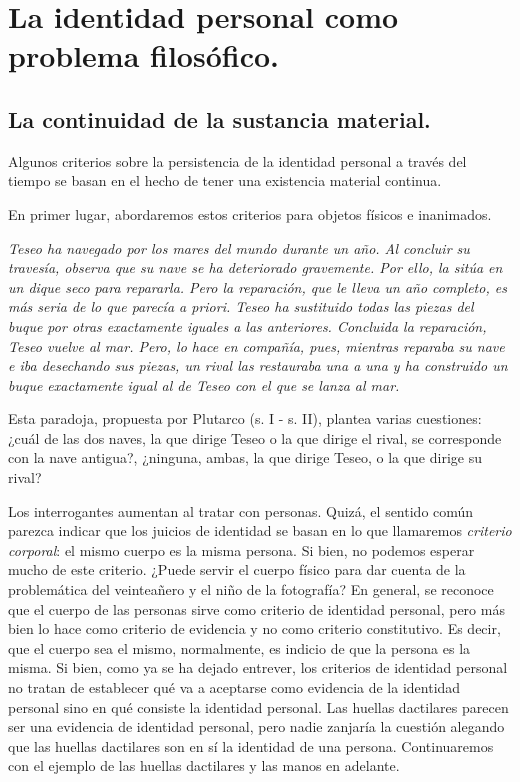 \documentclass[main.tex]{subfiles}
\begin{document}
\chapter{La identidad personal como problema filosófico.}	

\section{La continuidad de la sustancia material.}

Algunos criterios sobre la persistencia de la identidad personal a través del tiempo se basan en el hecho de tener una existencia material continua.

En primer lugar, abordaremos estos criterios para objetos físicos e inanimados.

\textit{Teseo ha navegado por los mares del mundo durante un año. Al concluir su travesía, observa que su nave se ha deteriorado gravemente. Por ello, la sitúa en un dique seco para repararla. Pero la reparación, que le lleva un año completo, es más seria de lo que parecía a priori. Teseo ha sustituido todas las piezas del buque por otras exactamente iguales a las anteriores. Concluida la reparación, Teseo vuelve al mar. Pero, lo hace en compañía, pues, mientras reparaba su nave e iba desechando sus piezas, un rival las restauraba una a una y ha construido un buque exactamente igual al de Teseo con el que se lanza al mar.}

Esta paradoja, propuesta por Plutarco (s. I - s. II), plantea varias cuestiones: ¿cuál de las dos naves, la que dirige Teseo o la que dirige el rival, se corresponde con la nave antigua?, ¿ninguna, ambas, la que dirige Teseo, o la que dirige su rival?

Los interrogantes aumentan al tratar con personas. Quizá, el sentido común parezca indicar que los juicios de identidad se basan en lo que llamaremos \textit{criterio corporal}: el mismo cuerpo es la misma persona. Si bien, no podemos esperar mucho de este criterio. ¿Puede servir el cuerpo físico para dar cuenta de la problemática del veinteañero y el niño de la fotografía? En general, se reconoce que el cuerpo de las personas sirve como criterio de identidad personal, pero más bien lo hace como criterio de evidencia y no como criterio constitutivo. Es decir, que el cuerpo sea el mismo, normalmente, es indicio de que la persona es la misma. Si bien, como ya se ha dejado entrever, los criterios de identidad personal no tratan de establecer qué va a aceptarse como evidencia de la identidad personal sino en qué consiste la identidad personal. Las huellas dactilares parecen ser una evidencia de identidad personal, pero nadie zanjaría la cuestión alegando que las huellas dactilares son en sí la identidad de una persona. Continuaremos con el ejemplo de las huellas dactilares y las manos en adelante. 
\end{document}
